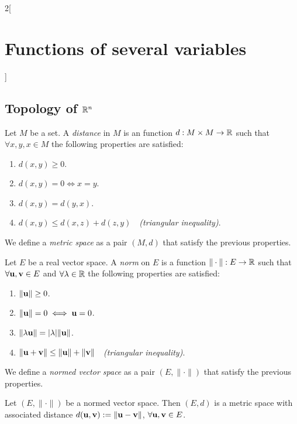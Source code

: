\documentclass[../../../main.tex]{subfiles}
\begin{document}
\begin{multicols}{2}[\section{Functions of several variables}]
    \subsection{Topology of \texorpdfstring{$\mathbb{R}^n$}{Rn}}
    \begin{definition}
        Let $M$ be a set. A \textit{distance} in $M$ is an function $d:M\times M\rightarrow\mathbb{R} $ such that $\forall x,y,x\in M$ the following properties are satisfied:
        \begin{enumerate}
            \item $d(x,y)\geq 0$.
            \item $d(x,y)=0\iff x=y$.
            \item $d(x,y)=d(y,x)$.
            \item $d(x,y)\leq d(x,z)+d(z,y)\quad$\textit{(triangular inequality)}.
        \end{enumerate}
        We define a \textit{metric space} as a pair $(M,d)$ that satisfy the previous properties.
        \label{FOSV_metric}
    \end{definition}
    \begin{definition}\label{FOSV_norm}
        Let $E$ be a real vector space. A \textit{norm} on $E$ is a function $\|\cdot\|:E\rightarrow\mathbb{R} $ such that $\forall \vb{u},\vb{v}\in E$ and $\forall\lambda\in\mathbb{R} $ the following properties are satisfied:
        \begin{enumerate}
            \item $\|\vb{u}\|\geq 0$.
            \item $\|\vb{u}\|=0\iff \vb{u}=0$.
            \item $\|\lambda \vb{u}\|=|\lambda|\|\vb{u}\|$.
            \item $\|\vb{u}+\vb{v}\|\leq \|\vb{u}\|+\|\vb{v}\|\quad$\textit{(triangular inequality)}.
        \end{enumerate}
        We define a \textit{normed vector space} as a pair $(E,\|\cdot\|)$ that satisfy the previous properties.
    \end{definition}
    \begin{prop}
        Let $(E,\|\cdot\|)$ be a normed vector space. Then $(E,d)$ is a metric space with associated distance $d(\vb{u},\vb{v}):=\|\vb{u}-\vb{v}\|$, $\forall \vb{u},\vb{v}\in E$.

\end{prop}
\end{multicols}
\end{document}
